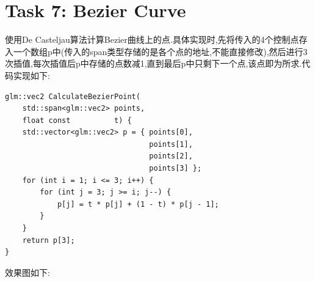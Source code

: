 \documentclass{ctexart}
\begin{document}
\section*{Task 7: Bezier Curve}
使用De Casteljau算法计算Bezier曲线上的点.具体实现时,先将传入的4个控制点存入一个数组{\codefont p}中(传入的{\codefont span}类型存储的是各个点的地址,不能直接修改),然后进行3次插值,每次插值后{\codefont p}中存储的点数减1,直到最后{\codefont p}中只剩下一个点,该点即为所求.代码实现如下:
\begin{lstlisting}
glm::vec2 CalculateBezierPoint(
    std::span<glm::vec2> points,
    float const          t) {
    std::vector<glm::vec2> p = { points[0],
                                 points[1],
                                 points[2],
                                 points[3] };
    for (int i = 1; i <= 3; i++) {
        for (int j = 3; j >= i; j--) {
            p[j] = t * p[j] + (1 - t) * p[j - 1];
        }
    }
    return p[3];
}
\end{lstlisting}
效果图如下:
\end{document}
